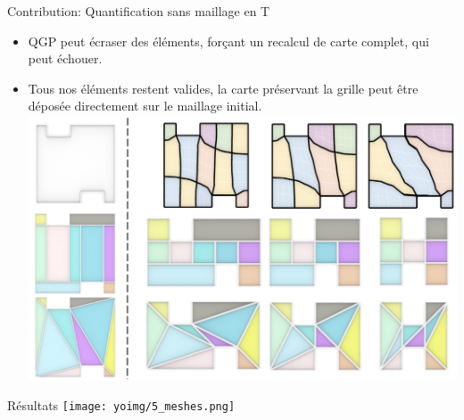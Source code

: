 \begin{frame}{Contribution: Quantification sans maillage en T}
    \begin{itemize}
        \item QGP peut écraser des éléments, forçant un recalcul de carte complet, qui peut échouer.\\
        \item Tous nos éléments restent valides, la carte préservant la grille peut être déposée directement sur le maillage initial.\\
        \centering
        \includegraphics[width=0.8\linewidth]{yoimg/restriction.png}
    \end{itemize}
\end{frame}

\begin{frame}{Résultats}
    \centering
    \texttt{[image: yoimg/5\_meshes.png]}
\end{frame}